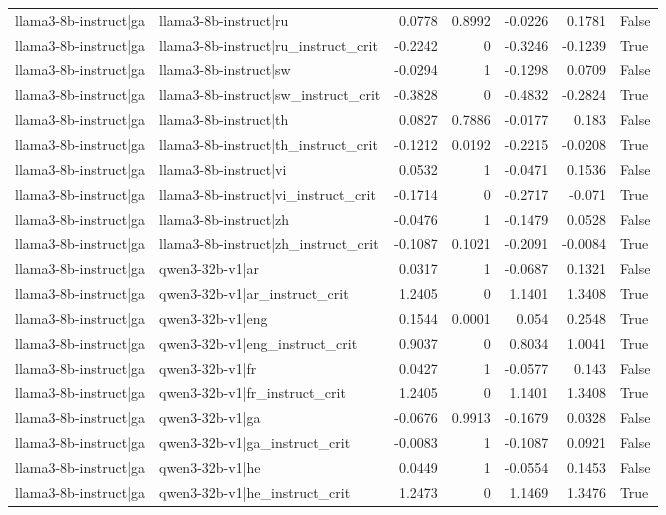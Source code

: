 \begin{table}
\begin{tabular}{l l r r r r l}
llama3-8b-instruct|ga & llama3-8b-instruct|ru & 0.0778 & 0.8992 & -0.0226 & 0.1781 & False \\
llama3-8b-instruct|ga & llama3-8b-instruct|ru_instruct_crit & -0.2242 & 0 & -0.3246 & -0.1239 & True \\
llama3-8b-instruct|ga & llama3-8b-instruct|sw & -0.0294 & 1 & -0.1298 & 0.0709 & False \\
llama3-8b-instruct|ga & llama3-8b-instruct|sw_instruct_crit & -0.3828 & 0 & -0.4832 & -0.2824 & True \\
llama3-8b-instruct|ga & llama3-8b-instruct|th & 0.0827 & 0.7886 & -0.0177 & 0.183 & False \\
llama3-8b-instruct|ga & llama3-8b-instruct|th_instruct_crit & -0.1212 & 0.0192 & -0.2215 & -0.0208 & True \\
llama3-8b-instruct|ga & llama3-8b-instruct|vi & 0.0532 & 1 & -0.0471 & 0.1536 & False \\
llama3-8b-instruct|ga & llama3-8b-instruct|vi_instruct_crit & -0.1714 & 0 & -0.2717 & -0.071 & True \\
llama3-8b-instruct|ga & llama3-8b-instruct|zh & -0.0476 & 1 & -0.1479 & 0.0528 & False \\
llama3-8b-instruct|ga & llama3-8b-instruct|zh_instruct_crit & -0.1087 & 0.1021 & -0.2091 & -0.0084 & True \\
llama3-8b-instruct|ga & qwen3-32b-v1|ar & 0.0317 & 1 & -0.0687 & 0.1321 & False \\
llama3-8b-instruct|ga & qwen3-32b-v1|ar_instruct_crit & 1.2405 & 0 & 1.1401 & 1.3408 & True \\
llama3-8b-instruct|ga & qwen3-32b-v1|eng & 0.1544 & 0.0001 & 0.054 & 0.2548 & True \\
llama3-8b-instruct|ga & qwen3-32b-v1|eng_instruct_crit & 0.9037 & 0 & 0.8034 & 1.0041 & True \\
llama3-8b-instruct|ga & qwen3-32b-v1|fr & 0.0427 & 1 & -0.0577 & 0.143 & False \\
llama3-8b-instruct|ga & qwen3-32b-v1|fr_instruct_crit & 1.2405 & 0 & 1.1401 & 1.3408 & True \\
llama3-8b-instruct|ga & qwen3-32b-v1|ga & -0.0676 & 0.9913 & -0.1679 & 0.0328 & False \\
llama3-8b-instruct|ga & qwen3-32b-v1|ga_instruct_crit & -0.0083 & 1 & -0.1087 & 0.0921 & False \\
llama3-8b-instruct|ga & qwen3-32b-v1|he & 0.0449 & 1 & -0.0554 & 0.1453 & False \\
llama3-8b-instruct|ga & qwen3-32b-v1|he_instruct_crit & 1.2473 & 0 & 1.1469 & 1.3476 & True \\

\end{tabular}
\end{table}

